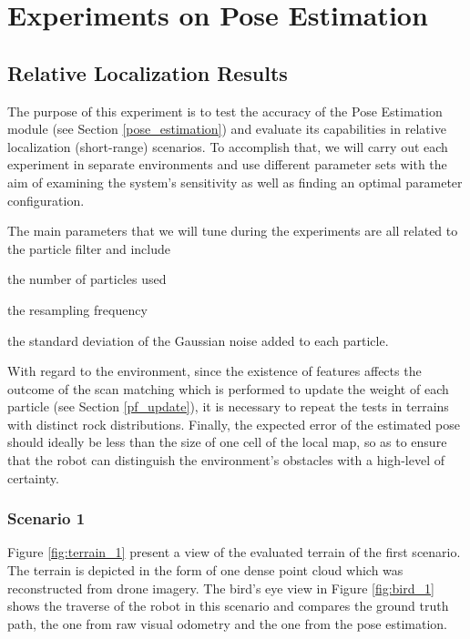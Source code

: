 \section{Experiments on Pose Estimation}

\subsection{Relative Localization Results}

The purpose of this experiment is to test the accuracy of the Pose Estimation
module (see Section \ref{pose_estimation}) and evaluate its capabilities
in relative localization (short-range) scenarios.
To accomplish that, we will carry out each experiment in separate
environments and use different parameter sets with the aim of examining the
system's sensitivity as well as finding an optimal parameter configuration.

The main parameters that we will tune during the experiments are all related
to the particle filter and include
\begin{enumerate*}[label=(\roman*)]
        \item the number of particles used
        \item the resampling frequency
        \item the standard deviation of the Gaussian noise
            added to each particle.
\end{enumerate*}
With regard to the environment, since the existence of features affects the
outcome of the scan matching which is performed to update the weight
of each particle (see Section \ref{pf_update}), it is necessary to
repeat the tests in terrains with distinct rock distributions.
Finally, the expected error of the estimated pose should
ideally be less than the size of one cell of the local map, so as to
ensure that the robot can distinguish the environment's obstacles with
a high-level of certainty.

\subsubsection{Scenario 1}

Figure \ref{fig:terrain_1} present a view of the evaluated terrain of the first
scenario.
The terrain is depicted in the form of one dense point cloud which was
reconstructed from drone imagery.
The bird's eye view in Figure \ref{fig:bird_1} shows the traverse of the
robot in this scenario and compares the ground truth path, the one
from raw visual odometry and the one from the pose estimation.

